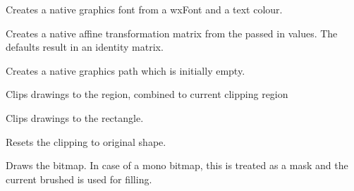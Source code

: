 \label{wxgraphicscontextcreatefont}


Creates a native graphics font from a wxFont and a text colour.

\label{wxgraphicscontextcreatematrix}


Creates a native affine transformation matrix from the passed in values. The defaults result in an identity matrix.

\label{wxgraphicscontextcreatepath}


Creates a native graphics path which is initially empty.

\label{wxgraphicscontextclip}


Clips drawings to the region, combined to current clipping region


Clips drawings to the rectangle.

\label{wxgraphicscontextresetclip}


Resets the clipping to original shape.

\label{wxgraphicscontextdrawbitmap}


Draws the bitmap. In case of a mono bitmap, this is treated as a mask and the current brushed is used for filling.

\label{wxgraphicscontextdrawellipse}

